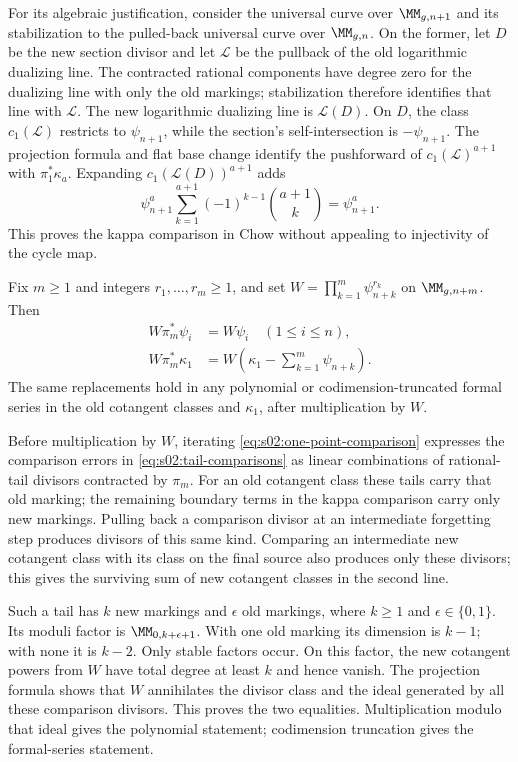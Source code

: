 For its algebraic justification, consider the universal curve over
$\MM_{g,n+1}$ and its stabilization to the pulled-back universal
curve over $\MM_{g,n}$.  On the former, let $D$ be the new section
divisor and let $\mathcal L$ be the pullback of the old logarithmic
dualizing line.  The contracted rational components have degree zero
for the dualizing line with only the old markings; stabilization
therefore identifies that line with $\mathcal L$.  The new
logarithmic dualizing line is $\mathcal L(D)$.  On $D$, the class
$c_1(\mathcal L)$ restricts to $\psi_{n+1}$, while the section's
self-intersection is $-\psi_{n+1}$.  The projection formula and flat
base change identify the pushforward of $c_1(\mathcal L)^{a+1}$
with $\pi_1^*\kappa_a$.  Expanding $c_1(\mathcal L(D))^{a+1}$ adds
\[
\psi_{n+1}^a\sum_{k=1}^{a+1}(-1)^{k-1}\binom{a+1}{k}
=\psi_{n+1}^a.
\]
This proves the kappa comparison in Chow without appealing to
injectivity of the cycle map.

\begin{lmm}
\label{lmm:s02:rational-tail-degree}
Fix $m\geq1$ and integers $r_1,\ldots,r_m\geq1$, and set
$W=\prod_{k=1}^m\psi_{n+k}^{r_k}$ on $\MM_{g,n+m}$.  Then
\begin{equation}
\label{eq:s02:tail-comparisons}
\begin{split}
W\pi_m^*\psi_i&=W\psi_i\quad(1\leq i\leq n),\\
W\pi_m^*\kappa_1
&=W\left(\kappa_1-\sum_{k=1}^m\psi_{n+k}\right).
\end{split}
\end{equation}
The same replacements hold in any polynomial or codimension-truncated
formal series in the old cotangent classes and $\kappa_1$, after
multiplication by $W$.
\end{lmm}

\begin{prf}
Before multiplication by $W$, iterating
\eqref{eq:s02:one-point-comparison} expresses the comparison errors
in \eqref{eq:s02:tail-comparisons} as linear combinations of
rational-tail divisors contracted by $\pi_m$.  For an old cotangent
class these tails carry that old marking; the remaining boundary
terms in the kappa comparison carry only new markings.  Pulling back a comparison
divisor at an intermediate forgetting step produces divisors of this
same kind.  Comparing an intermediate new cotangent class with its
class on the final source also produces only these divisors; this
gives the surviving sum of new cotangent classes in the second line.

Such a tail has $k$ new markings and $\epsilon$ old markings, where
$k\geq1$ and $\epsilon\in\{0,1\}$.  Its moduli factor is
$\MM_{0,k+\epsilon+1}$.  With one old marking its dimension is
$k-1$; with none it is $k-2$.  Only stable factors occur.  On this
factor, the new cotangent powers from $W$ have total degree at least
$k$ and hence vanish.  The projection formula shows that $W$
annihilates the divisor class and the ideal generated by all these
comparison divisors.  This proves the two equalities.  Multiplication
modulo that ideal gives the polynomial statement; codimension
truncation gives the formal-series statement.
\end{prf}

